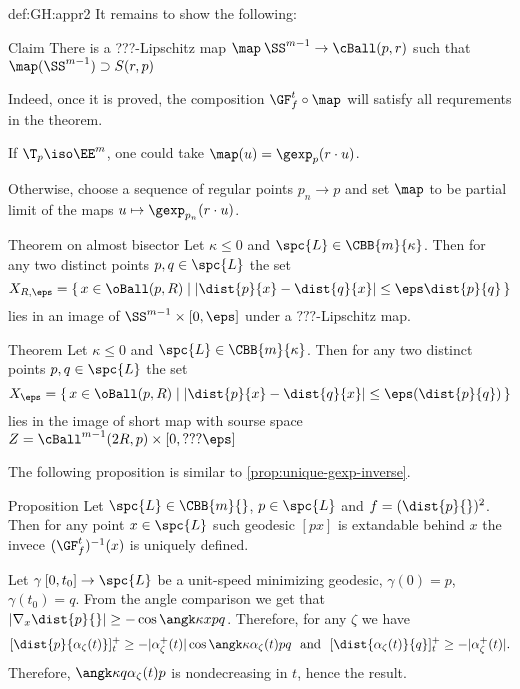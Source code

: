 {\begin{subthm}{def:GH:appr2}
It remains to show the following:

\begin{clm}{Claim}
There is a ???-Lipschitz map $\map\:\SS^{m-1}\to \cBall(p,r)$ such that $\map(\SS^{m-1})\supset S(r,p)$
\end{clm}

Indeed, once it is proved, the composition $\GF^t_f\circ\map$ will satisfy all requrements in the theorem.

If $\T_p\iso\EE^m$, one could take $\map(u)=\gexp_p(r\cdot u)$.

Otherwise, choose a sequence of regular points $p_n\to p$ and set $\map$ to be partial limit of the maps $u\mapsto \gexp_{p_n}(r\cdot u)$.
\qeds

\begin{thm}{Theorem on almost bisector}
Let $\kappa\le 0$ and $\spc{L}\in \CBB{m}{\kappa}$.
Then for any two distinct points $p,q\in \spc{L}$ the set 
$$X_{R,\eps}=
\{\,
x\in\oBall(p,R)
\mid
|\dist{p}{x}-\dist{q}{x}|\le\eps\dist{p}{q}
\,\}$$
lies in an image of $\SS^{m-1}\times [0,\eps]$ under a $???$-Lipschitz map.
\end{thm}

\begin{thm}{Theorem}
Let $\kappa\le 0$ and $\spc{L}\in \CBB{m}{\kappa}$.
Then for any two distinct points $p,q\in \spc{L}$ the set 
$$X_\eps=\{\,x\in\oBall(p,R) \mid |\dist{p}{x}-\dist{q}{x}|\le\eps(\dist{p}{q})\,\}$$
lies in the image of short map with sourse space $Z=\cBall^{m-1}(2R,p)\times[0,???\eps]$
\end{thm}


The following proposition is similar to \ref{prop:unique-gexp-inverse}.

\begin{thm}{Proposition}
Let $\spc{L}\in\CBB{m}{}$, $p\in\spc{L}$ and $f=(\dist{p}{})^2$.
Then for any point $x\in \spc{L}$ such geodesic $[px]$ is extandable behind $x$ the invece
$(\GF_f^t)^{-1}(x)$ is uniquely defined.
\end{thm}

 Let $\gamma\:[0,t_0]\to \spc{L}$ be a unit-speed minimizing geodesic,
$\gamma(0)=p$, $\gamma(t_0)=q$.
From the angle comparison we get that $|\nabla_x\dist{p}{}|\ge-\cos\angk\kappa x p q$. 
Therefore, for any $\zeta$ we have
$$[\dist{p}{\alpha_\zeta(t)}]^+_t
\ge
-|\alpha^+_\zeta(t)|\cos\angk\kappa{\alpha_\zeta(t)}p q\ \ \text{and}\ \ [\dist{\alpha_\zeta(t)}{q}]^+_t\ge-|\alpha^+_\zeta(t)|.$$
Therefore, $\angk\kappa q {\alpha_\zeta(t)}p $ is nondecreasing in $t$, hence the result.
\qeds


\end{subthm}}
